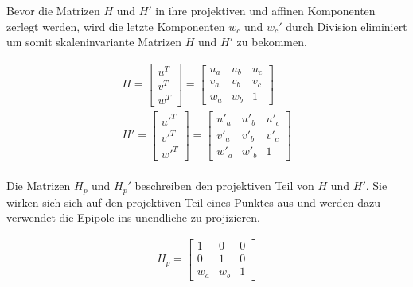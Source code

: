 Bevor die Matrizen $H$ und $H'$ in ihre projektiven und affinen Komponenten zerlegt werden, wird die letzte Komponenten $w_c$ und $w_c'$ durch Division eliminiert um somit skaleninvariante Matrizen $H$ und $H'$ zu bekommen\cite{ZZ,phdextrinsicPara}. 
%

\begin{gather}
	H = \begin{bmatrix}
		u^T\\v^T\\w^T
	\end{bmatrix} =
	\begin{bmatrix}
		u_a&u_b&u_c\\
		v_a&v_b&v_c\\
		w_a&w_b&1
	\end{bmatrix}\\
	H' = \begin{bmatrix}
		u'^T\\v'^T\\w'^T
	\end{bmatrix} =
	\begin{bmatrix}
		u'_a&u'_b&u'_c\\
		v'_a&v'_b&v'_c\\
		w'_a&w'_b&1
	\end{bmatrix}	
\end{gather}\\


Die Matrizen $H_p$ und $H_p'$ beschreiben den projektiven Teil von $H$ und $H'$. Sie wirken sich sich auf den projektiven Teil eines Punktes aus und werden dazu verwendet die Epipole ins unendliche zu projizieren\cite{ZZ,phdextrinsicPara}.

%
%

\begin{gather}
	H_p = 
	\begin{bmatrix}
		1&0&0\\
		0&1&0\\
		w_a&w_b&1
	\end{bmatrix}
\end{gather}\\

